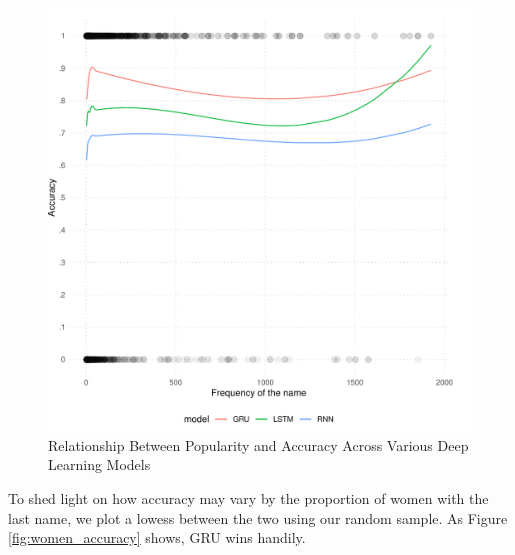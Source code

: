 \documentclass[11pt,  letterpaper]{article}
\begin{document}
\begin{figure}[!htb]

  \centering

    \caption{Relationship Between Popularity and Accuracy Across Various Deep Learning Models}

  \includegraphics[]{figs/popularity_perf.pdf}

  \label{fig:popularity_accuracy}

\end{figure}

To shed light on how accuracy may vary by the proportion of women with the last name, we plot a lowess between the two using our random sample. As Figure \ref{fig:women_accuracy} shows, GRU wins handily. 
\end{document}
